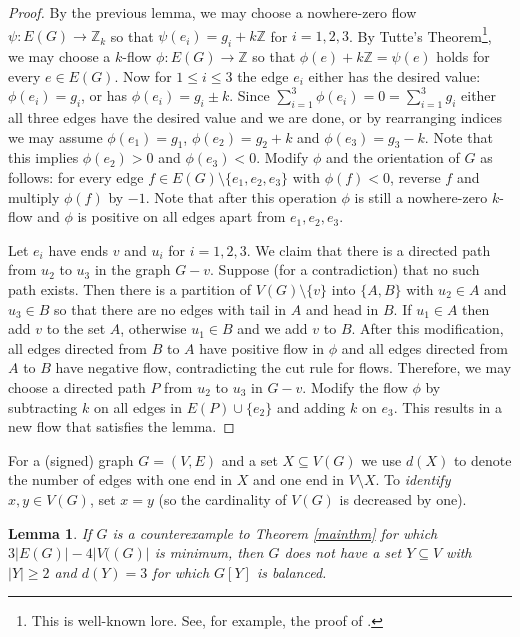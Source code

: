 \documentclass[12pt]{article}
\newtheorem{lemma}[theorem]{Lemma}
\begin{document}
\begin{proof}
    By the previous lemma, we may choose a nowhere-zero flow $\psi : E(G) \rightarrow \mathbb{Z}_k$
so that $\psi(e_i) = g_i + k \mathbb{Z}$ for $i =1,2,3$.  By Tutte's Theorem\footnote{This is well-known lore. See, for example, the proof of \cite[Theorem 21.3]{BondyMurty2008}.}, we may choose a $k$-flow $\phi : E(G) \rightarrow \mathbb{Z}$ so that $\phi(e) + k \mathbb{Z} = \psi(e)$ holds for every $e \in E(G)$.  Now for $1 \le i \le 3$ the edge $e_i$ either has the desired value: $\phi(e_i) = g_i$, or has $\phi(e_i) = g_i \pm k$.  Since $\sum_{i=1}^3 \phi(e_i) = 0 = \sum_{i=1}^3 g_i$ either all three edges have the desired value and we are done, or by rearranging indices we may assume $\phi(e_1) = g_1$, $\phi(e_2) = g_2 + k$ and $\phi(e_3) = g_3 - k$.  Note that this implies $\phi(e_2) > 0$ and $\phi(e_3) < 0$.  Modify $\phi$ and the orientation of $G$ as follows:  for every edge $f \in E(G) \setminus \{e_1,e_2,e_3\}$ with $\phi(f) < 0$, reverse $f$ and multiply $\phi(f)$ by $-1$.  Note that after this operation $\phi$ is still a nowhere-zero $k$-flow and $\phi$ is positive on all edges apart from $e_1, e_2, e_3$. 

Let $e_i$ have ends $v$ and $u_i$ for $i=1,2,3$.  We claim that there is a directed path from $u_2$ to $u_3$ in the graph $G - v$.  Suppose (for a contradiction) that no such path exists.  Then there is a partition of $V(G) \setminus \{v\}$ into $\{A,B\}$ with $u_2 \in A$ and $u_3 \in B$ so that there are no edges with tail in $A$ and head in $B$.  If $u_1 \in A$ then add $v$ to the set $A$, otherwise $u_1 \in B$ and we add $v$ to $B$.  After this modification, all edges directed from $B$ to $A$ have positive flow in $\phi$ and all edges directed from $A$ to $B$ have negative flow, contradicting the cut rule for flows.  Therefore, we may choose a directed path $P$ from $u_2$ to $u_3$ in $G-v$.  Modify the flow $\phi$ by subtracting $k$ on all edges in $E(P) \cup \{e_2\}$ and adding $k$ on $e_3$.  This results in a new flow that satisfies the lemma.
\end{proof}

For a (signed) graph $G=(V,E)$ and a set $X \subseteq V(G)$ we use $d(X)$ to denote the number of edges with one end in $X$ and one end in $V\setminus X$.
To \emph{identify} $x,y \in V(G)$, set $x = y$ (so the cardinality of $V(G)$ is decreased by one).

\begin{lemma}\label{control3edgecut}
    If $G$ is a counterexample to Theorem \ref{mainthm} for which $3|E(G)| - 4|V((G)|$ is minimum, then $G$ does not have a set $Y \subseteq V$ with $|Y| \ge 2$ and $d(Y) = 3$ for which $G[Y]$ is balanced.  
\end{lemma}
\end{document}
